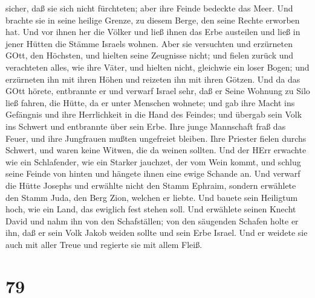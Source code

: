 sicher, daß sie sich nicht fürchteten; aber ihre Feinde bedeckte das
Meer.  Und brachte sie in seine heilige Grenze, zu diesem
Berge, den seine Rechte erworben hat.  Und vor ihnen her
die Völker und ließ ihnen das Erbe austeilen und ließ in jener Hütten
die Stämme Israels wohnen.  Aber sie versuchten und
erzürneten GOtt, den Höchsten, und hielten seine Zeugnisse nicht;
 und fielen zurück und verachteten alles, wie ihre Väter,
und hielten nicht, gleichwie ein loser Bogen;  und
erzürneten ihn mit ihren Höhen und reizeten ihn mit ihren Götzen.
 Und da das GOtt hörete, entbrannte er und verwarf Israel
sehr,  daß er Seine Wohnung zu Silo ließ fahren, die Hütte,
da er unter Menschen wohnete;  und gab ihre Macht ins
Gefängnis und ihre Herrlichkeit in die Hand des Feindes; 
und übergab sein Volk ins Schwert und entbrannte über sein Erbe.
 Ihre junge Mannschaft fraß das Feuer, und ihre Jungfrauen
mußten ungefreiet bleiben.  Ihre Priester fielen durchs
Schwert, und waren keine Witwen, die da weinen sollten. 
Und der HErr erwachte wie ein Schlafender, wie ein Starker jauchzet, der
vom Wein kommt,  und schlug seine Feinde von hinten und
hängete ihnen eine ewige Schande an.  Und verwarf die Hütte
Josephs und erwählte nicht den Stamm Ephraim,  sondern
erwählete den Stamm Juda, den Berg Zion, welchen er liebte.
 Und bauete sein Heiligtum hoch, wie ein Land, das ewiglich
fest stehen soll.  Und erwählete seinen Knecht David und
nahm ihn von den Schafställen;  von den säugenden Schafen
holte er ihn, daß er sein Volk Jakob weiden sollte und sein Erbe Israel.
 Und er weidete sie auch mit aller Treue und regierte sie
mit allem Fleiß.

\hypertarget{section-78}{%
\section{79}\label{section-78}}

